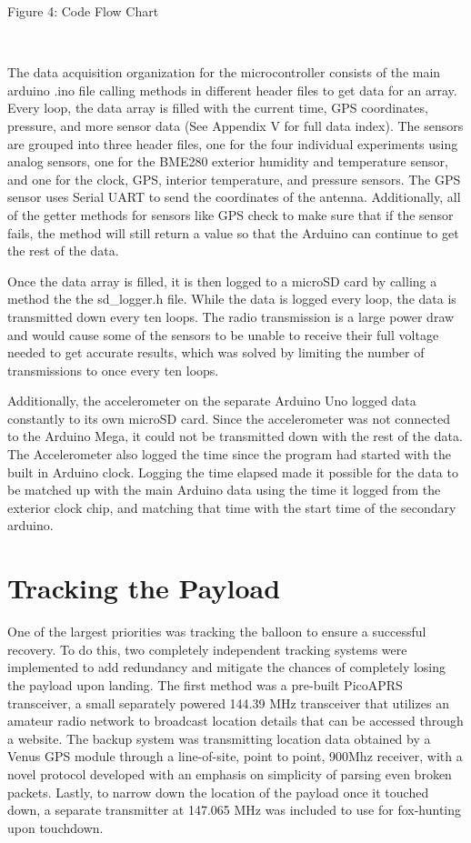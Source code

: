 \documentclass[12pt,]{article}
\begin{document}
Figure 4: Code Flow Chart

~

The data acquisition organization for the microcontroller consists of
the main arduino .ino file calling methods in different header files to
get data for an array. Every loop, the data array is filled with the
current time, GPS coordinates, pressure, and more sensor data (See
Appendix V for full data index). The sensors are grouped into three
header files, one for the four individual experiments using analog
sensors, one for the BME280 exterior humidity and temperature sensor,
and one for the clock, GPS, interior temperature, and pressure sensors.
The GPS sensor uses Serial UART to send the coordinates of the antenna.
Additionally, all of the getter methods for sensors like GPS check to
make sure that if the sensor fails, the method will still return a value
so that the Arduino can continue to get the rest of the data.

Once the data array is filled, it is then logged to a microSD card by
calling a method the the sd\_logger.h file. While the data is logged
every loop, the data is transmitted down every ten loops. The radio
transmission is a large power draw and would cause some of the sensors
to be unable to receive their full voltage needed to get accurate
results, which was solved by limiting the number of transmissions to
once every ten loops.

Additionally, the accelerometer on the separate Arduino Uno logged data
constantly to its own microSD card. Since the accelerometer was not
connected to the Arduino Mega, it could not be transmitted down with the
rest of the data. The Accelerometer also logged the time since the
program had started with the built in Arduino clock. Logging the time
elapsed made it possible for the data to be matched up with the main
Arduino data using the time it logged from the exterior clock chip, and
matching that time with the start time of the secondary arduino.

\section{Tracking the Payload}\label{tracking-the-payload}

One of the largest priorities was tracking the balloon to ensure a
successful recovery. To do this, two completely independent tracking
systems were implemented to add redundancy and mitigate the chances of
completely losing the payload upon landing. The first method was a
pre-built PicoAPRS transceiver, a small separately powered 144.39 MHz
transceiver that utilizes an amateur radio network to broadcast location
details that can be accessed through a website. The backup system was
transmitting location data obtained by a Venus GPS module through a
line-of-site, point to point, 900Mhz receiver, with a novel protocol
developed with an emphasis on simplicity of parsing even broken packets.
Lastly, to narrow down the location of the payload once it touched down,
a separate transmitter at 147.065 MHz was included to use for
fox-hunting upon touchdown.
\end{document}
